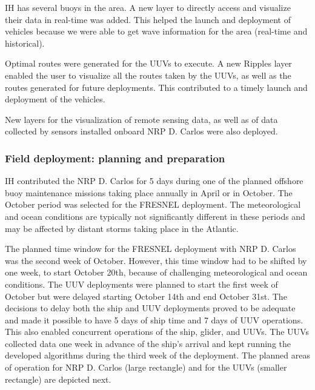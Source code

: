 IH has several buoys in the area. A new layer to directly access and visualize their data in real-time was added. This helped the launch and deployment of vehicles because we were able to get wave information for the area (real-time and historical).
 
Optimal routes were generated for the UUVs to execute. A new Ripples layer enabled the user to visualize all the routes taken by the UUVs, as well as the routes generated for future deployments. This contributed to a timely launch and deployment of the vehicles.
 
New layers for the visualization of remote sensing data, as well as of data collected by sensors installed onboard NRP D. Carlos were also deployed.



\subsubsection{Field deployment: planning and preparation}

IH contributed the NRP D. Carlos for 5 days during one of the planned offshore buoy maintenance missions taking place annually in April or in October. The October period was selected for the FRESNEL deployment. The meteorological and ocean conditions are typically not significantly different in these periods and may be affected by distant storms taking place in the Atlantic.

The planned time window for the FRESNEL deployment with NRP D. Carlos was the second week of October. However, this time window had to be shifted by one week, to start October 20th, because of challenging meteorological and ocean conditions. The UUV deployments were planned to start the first week of October but were delayed starting October 14th and end October 31st. The decisions to delay both the ship and UUV deployments proved to be adequate and made it possible to have 5 days of ship time and 7 days of UUV operations. This also enabled concurrent operations of the ship, glider, and UUVs. The UUVs collected data one week in advance of the ship’s arrival and kept running the developed algorithms during the third week of the deployment. The planned areas of operation for NRP D. Carlos (large rectangle) and for the UUVs (smaller rectangle) are depicted next. 

